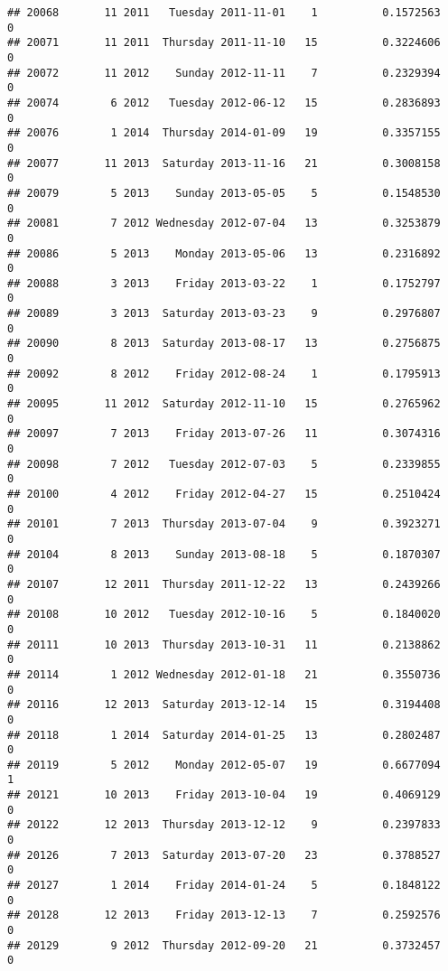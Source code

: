 \documentclass[
]{article}
\begin{document}
\begin{verbatim}
## 20068       11 2011   Tuesday 2011-11-01    1          0.1572563             0
## 20071       11 2011  Thursday 2011-11-10   15          0.3224606             0
## 20072       11 2012    Sunday 2012-11-11    7          0.2329394             0
## 20074        6 2012   Tuesday 2012-06-12   15          0.2836893             0
## 20076        1 2014  Thursday 2014-01-09   19          0.3357155             0
## 20077       11 2013  Saturday 2013-11-16   21          0.3008158             0
## 20079        5 2013    Sunday 2013-05-05    5          0.1548530             0
## 20081        7 2012 Wednesday 2012-07-04   13          0.3253879             0
## 20086        5 2013    Monday 2013-05-06   13          0.2316892             0
## 20088        3 2013    Friday 2013-03-22    1          0.1752797             0
## 20089        3 2013  Saturday 2013-03-23    9          0.2976807             0
## 20090        8 2013  Saturday 2013-08-17   13          0.2756875             0
## 20092        8 2012    Friday 2012-08-24    1          0.1795913             0
## 20095       11 2012  Saturday 2012-11-10   15          0.2765962             0
## 20097        7 2013    Friday 2013-07-26   11          0.3074316             0
## 20098        7 2012   Tuesday 2012-07-03    5          0.2339855             0
## 20100        4 2012    Friday 2012-04-27   15          0.2510424             0
## 20101        7 2013  Thursday 2013-07-04    9          0.3923271             0
## 20104        8 2013    Sunday 2013-08-18    5          0.1870307             0
## 20107       12 2011  Thursday 2011-12-22   13          0.2439266             0
## 20108       10 2012   Tuesday 2012-10-16    5          0.1840020             0
## 20111       10 2013  Thursday 2013-10-31   11          0.2138862             0
## 20114        1 2012 Wednesday 2012-01-18   21          0.3550736             0
## 20116       12 2013  Saturday 2013-12-14   15          0.3194408             0
## 20118        1 2014  Saturday 2014-01-25   13          0.2802487             0
## 20119        5 2012    Monday 2012-05-07   19          0.6677094             1
## 20121       10 2013    Friday 2013-10-04   19          0.4069129             0
## 20122       12 2013  Thursday 2013-12-12    9          0.2397833             0
## 20126        7 2013  Saturday 2013-07-20   23          0.3788527             0
## 20127        1 2014    Friday 2014-01-24    5          0.1848122             0
## 20128       12 2013    Friday 2013-12-13    7          0.2592576             0
## 20129        9 2012  Thursday 2012-09-20   21          0.3732457             0

\end{verbatim}
\end{document}
